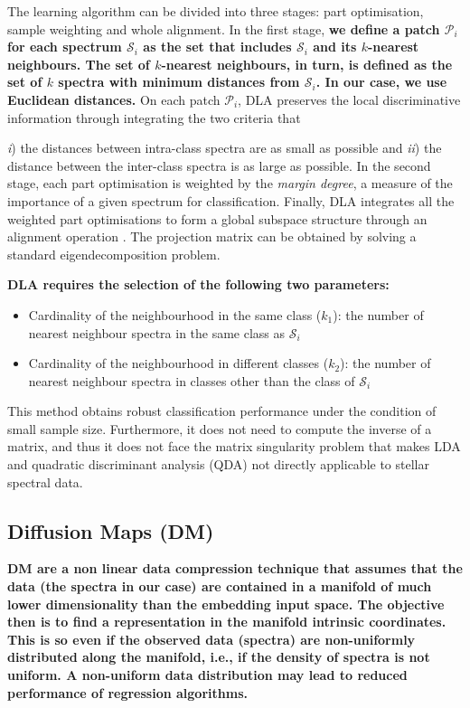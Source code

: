 \documentclass[a4paper,fleqn,usenatbib]{mnras}
\begin{document}
The learning algorithm can be divided into three stages: part optimisation, 
sample weighting and whole alignment. In the first stage, {\bf we define a 
	patch $\mathcal{P}_i$ for each spectrum $\mathcal{S}_i$ as the set that 
	includes $\mathcal{S}_i$ and its $k$-nearest neighbours. The set of 
	$k$-nearest neighbours, in turn, is defined as the set of $k$ spectra 
	with minimum distances from $\mathcal{S}_i$. In our case, we use Euclidean 
	distances.} On each patch $\mathcal{P}_i$, DLA preserves the local discriminative information 
through integrating the two criteria that {\textit{i}) the distances between 
intra-class spectra are as small as possible and \textit{ii}) the distance
  between the inter-class spectra is as large as possible. In the
  second stage, each part optimisation is weighted by the
  \textit{margin degree}, a measure of the importance of a given
  spectrum for classification. Finally, DLA integrates all the weighted
  part optimisations to form a global subspace structure through an
  alignment operation \citep{2002cs.......12008Z}. The projection
  matrix can be obtained by solving a standard eigendecomposition
  problem.
  
{\bf
DLA requires the selection of the following two parameters:
\begin{itemize}
\item Cardinality of the neighbourhood in the same class ($k_1$): 
	the number of nearest neighbour spectra in the same class as $\mathcal{S}_i$
\item Cardinality of the neighbourhood in different classes ($k_2$): 
	the number of nearest neighbour spectra in classes other than the 
	class of $\mathcal{S}_i$
\end{itemize}
}

This method obtains robust classification performance under the
condition of small sample size. Furthermore, it does not need to
compute the inverse of a matrix, and thus it does not face the matrix
singularity problem that makes LDA and quadratic discriminant analysis 
(QDA) not directly applicable to stellar spectral data.

\subsection{Diffusion Maps (DM)}

{\bf DM \citep{coifman:06,nadler:06} are a non linear data compression 
technique that assumes that the data (the spectra in our case) are 
contained in a manifold of much lower dimensionality than the 
embedding input space. The objective then is to find a representation 
in the manifold intrinsic coordinates. This is so even if the observed 
data (spectra) are non-uniformly distributed along the manifold, i.e., 
if the density of spectra is not uniform. A non-uniform data distribution 
may lead to reduced performance of regression algorithms.

}}
\end{document}
